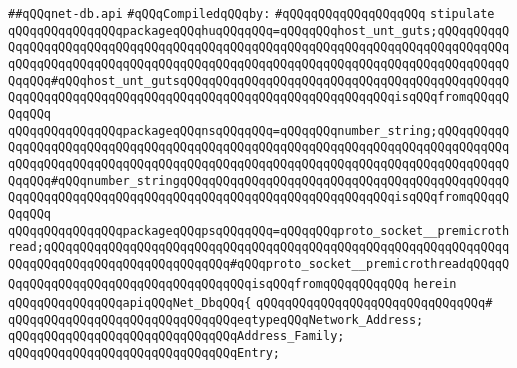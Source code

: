 \label{src/lib/std/src/socket/net-db.api}
\verb|##qQQqnet-db.api|\newline
\newline
\verb|#qQQqCompiledqQQqby:|\newline
\verb|#qQQqqQQqqQQqqQQqqQQq|\newline
\newline
\newline
\verb|stipulate|\newline
\verb|qQQqqQQqqQQqqQQqpackageqQQqhuqQQqqQQq=qQQqqQQqhost_unt_guts;qQQqqQQqqQQqqQQqqQQqqQQqqQQqqQQqqQQqqQQqqQQqqQQqqQQqqQQqqQQqqQQqqQQqqQQqqQQqqQQqqQQqqQQqqQQqqQQqqQQqqQQqqQQqqQQqqQQqqQQqqQQqqQQqqQQqqQQqqQQqqQQqqQQqqQQqqQQq#qQQqhost_unt_gutsqQQqqQQqqQQqqQQqqQQqqQQqqQQqqQQqqQQqqQQqqQQqqQQqqQQqqQQqqQQqqQQqqQQqqQQqqQQqqQQqqQQqqQQqqQQqqQQqqQQqisqQQqfromqQQqqQQqqQQq|\newline
\verb|qQQqqQQqqQQqqQQqpackageqQQqnsqQQqqQQq=qQQqqQQqnumber_string;qQQqqQQqqQQqqQQqqQQqqQQqqQQqqQQqqQQqqQQqqQQqqQQqqQQqqQQqqQQqqQQqqQQqqQQqqQQqqQQqqQQqqQQqqQQqqQQqqQQqqQQqqQQqqQQqqQQqqQQqqQQqqQQqqQQqqQQqqQQqqQQqqQQqqQQqqQQq#qQQqnumber_stringqQQqqQQqqQQqqQQqqQQqqQQqqQQqqQQqqQQqqQQqqQQqqQQqqQQqqQQqqQQqqQQqqQQqqQQqqQQqqQQqqQQqqQQqqQQqqQQqqQQqisqQQqfromqQQqqQQqqQQq|\newline
\verb|qQQqqQQqqQQqqQQqpackageqQQqpsqQQqqQQq=qQQqqQQqproto_socket__premicrothread;qQQqqQQqqQQqqQQqqQQqqQQqqQQqqQQqqQQqqQQqqQQqqQQqqQQqqQQqqQQqqQQqqQQqqQQqqQQqqQQqqQQqqQQqqQQqqQQq#qQQqproto_socket__premicrothreadqQQqqQQqqQQqqQQqqQQqqQQqqQQqqQQqqQQqqQQqisqQQqfromqQQqqQQqqQQq|\newline
\verb|herein|\newline
\newline
\verb|qQQqqQQqqQQqqQQqapiqQQqNet_DbqQQq{|\newline
\verb|qQQqqQQqqQQqqQQqqQQqqQQqqQQqqQQq#|\newline
\verb|qQQqqQQqqQQqqQQqqQQqqQQqqQQqqQQqeqtypeqQQqNetwork_Address;|\newline
\verb|qQQqqQQqqQQqqQQqqQQqqQQqqQQqqQQqAddress_Family;|\newline
\verb|qQQqqQQqqQQqqQQqqQQqqQQqqQQqqQQqEntry;|\newline
